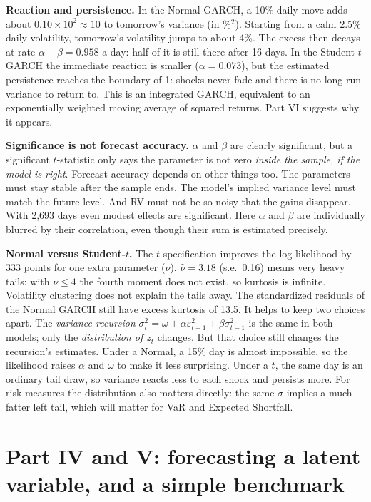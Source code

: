 \documentclass[10pt,a4paper]{article}
\begin{document}
\textbf{Reaction and persistence.} In the Normal GARCH, a 10\% daily move adds about $0.10\times10^2\approx10$
to tomorrow's variance (in \%$^2$). Starting from a calm 2.5\% daily volatility, tomorrow's volatility jumps to about
4\%. The excess then decays at rate $\alpha+\beta=0.958$ a day: half of it is still there after 16 days. In the
Student-$t$ GARCH the immediate reaction is smaller ($\alpha=0.073$), but the estimated persistence reaches the
boundary of 1: shocks never fade and there is no long-run variance to return to. This is an integrated GARCH,
equivalent to an exponentially weighted moving average of squared returns. Part VI suggests why it appears.

\textbf{Significance is not forecast accuracy.} $\alpha$ and $\beta$ are clearly significant, but a significant
$t$-statistic only says the parameter is not zero \emph{inside the sample, if the model is right}. Forecast accuracy
depends on other things too. The parameters must stay stable after the sample ends. The model's implied variance level
must match the future level. And RV must not be so noisy that the gains disappear. With 2,693 days even modest effects are
significant. Here $\alpha$ and $\beta$ are individually blurred by their correlation, even though their sum is
estimated precisely.

\textbf{Normal versus Student-$t$.} The $t$ specification improves the log-likelihood by 333 points for one extra parameter
($\nu$). $\hat\nu=3.18$ (s.e.\ 0.16) means very heavy tails: with $\nu\le4$ the fourth moment does not exist, so
kurtosis is infinite. Volatility clustering does not explain the tails away. The standardized residuals of the Normal
GARCH still have excess kurtosis of 13.5. It helps to keep two choices apart. The \emph{variance recursion}
$\sigma^2_t=\omega+\alpha\varepsilon^2_{t-1}+\beta\sigma^2_{t-1}$ is the same in both models; only the
\emph{distribution of $z_t$} changes. But that choice still changes the recursion's estimates. Under a Normal, a 15\%
day is almost impossible, so the likelihood raises $\alpha$ and $\omega$ to make it less surprising. Under a $t$,
the same day is an ordinary tail draw, so variance reacts less to each shock and persists more. For risk measures the
distribution also matters directly: the same $\sigma$ implies a much fatter left tail, which will matter for VaR and
Expected Shortfall.

\section{Part IV and V: forecasting a latent variable, and a simple benchmark}
\end{document}
